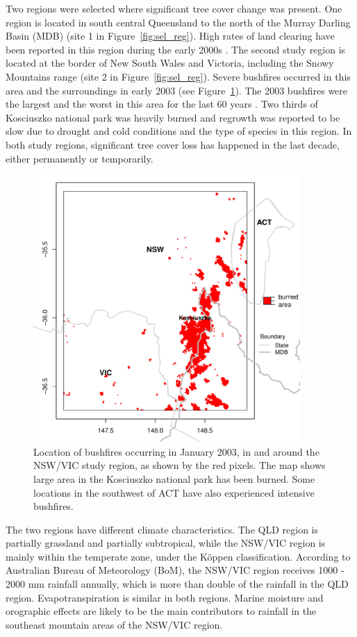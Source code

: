 \documentclass[draft,linenumbers]{agujournal}
\begin{document}
Two regions were selected where significant tree cover change was present. One region is located in south central Queensland to the north of the Murray Darling Basin (MDB) (site 1 in Figure~\ref{fig:sel_reg}). High rates of land clearing have been reported in this region during the early 2000s \citep{SLATS2004}. The second study region is located at the border of New South Wales and Victoria, including the Snowy Mountains range (site 2 in Figure~\ref{fig:sel_reg}). Severe bushfires occurred in this area and the surroundings in early 2003 (see Figure~\ref{fig:bushfire}). The 2003 bushfires were the largest and the worst in this area for the last 60 years \citep{Fire2011}. Two thirds of Kosciuszko national park was heavily burned and regrowth was reported to be slow due to drought and cold conditions \citep{ABC2003} and the type of species in this region. In both study regions, significant tree cover loss has happened in the last decade, either permanently or temporarily.

\begin{figure}[ht!]
  \centerline{\includegraphics[height=4in, clip, scale=0.6]{bushfire_nswvic.pdf}}
  \caption{Location of bushfires occurring in January 2003, in and around the NSW/VIC study region, as shown by the red pixels. The map shows large area in the Kosciuszko national park has been burned. Some locations in the southwest of ACT have also experienced intensive bushfires.}
  \label{fig:bushfire}
\end{figure}

The two regions have different climate characteristics. The QLD region is partially grassland and partially subtropical, while the NSW/VIC region is mainly within the temperate zone, under the K\"{o}ppen classification. According to Australian Bureau of Meteorology (BoM), the NSW/VIC region receives 1000 - 2000 mm rainfall annually, which is more than double of the rainfall in the QLD region. Evapotranspiration is similar in both regions. Marine moisture and orographic effects are likely to be the main contributors to rainfall in the southeast mountain areas of the NSW/VIC region. 
\end{document}
